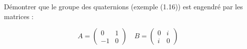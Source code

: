 Démontrer que le groupe des quaternions (exemple (1.16)) est engendré par les matrices :


\[
A = \begin{pmatrix}
    0 & 1 \\
    -1 & 0
\end{pmatrix}\quad
B = \begin{pmatrix}
    0 & i \\
    i & 0
    \end{pmatrix}
\]

